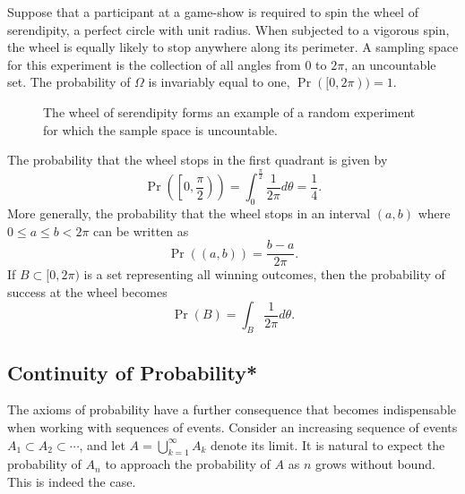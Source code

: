 \begin{example}
Suppose that a participant at a game-show is required to spin the wheel of serendipity, a perfect circle with unit radius.
When subjected to a vigorous spin, the wheel is equally likely to stop anywhere along its perimeter.
A sampling space for this experiment is the collection of all angles from $0$ to $2 \pi$, an uncountable set.
The probability of $\Omega$ is invariably equal to one, $\Pr ([0, 2 \pi)) = 1$.

\begin{figure}[tbh!]
\begin{center}
\caption{The wheel of serendipity forms an example of a random experiment for which the sample space is uncountable.}
\end{center}
\end{figure}

The probability that the wheel stops in the first quadrant is given by
\begin{equation*}
\Pr \left( \left[ 0, \frac{\pi}{2} \right) \right)
= \int_{0}^{\frac{\pi}{2}} \frac{1}{2 \pi} d\theta
= \frac{1}{4}.
\end{equation*}
More generally, the probability that the wheel stops in an interval $(a, b)$ where $0 \leq a \leq b < 2 \pi$ can be written as
\begin{equation*}
\Pr ((a,b)) = \frac{b - a}{2 \pi}.
\end{equation*}
If $B \subset [0, 2 \pi)$ is a set representing all winning outcomes, then the probability of success at the wheel becomes
\begin{equation*}
\Pr(B) = \int_B \frac{1}{2 \pi} d\theta .
\end{equation*}
\end{example}


\subsection{Continuity of Probability*}

The axioms of probability have a further consequence that becomes indispensable when working with sequences of events.
Consider an increasing sequence of events $A_1 \subset A_2 \subset \cdots$, and let $A = \bigcup_{k=1}^{\infty} A_k$ denote its limit.
It is natural to expect the probability of $A_n$ to approach the probability of $A$ as $n$ grows without bound.
This is indeed the case.

